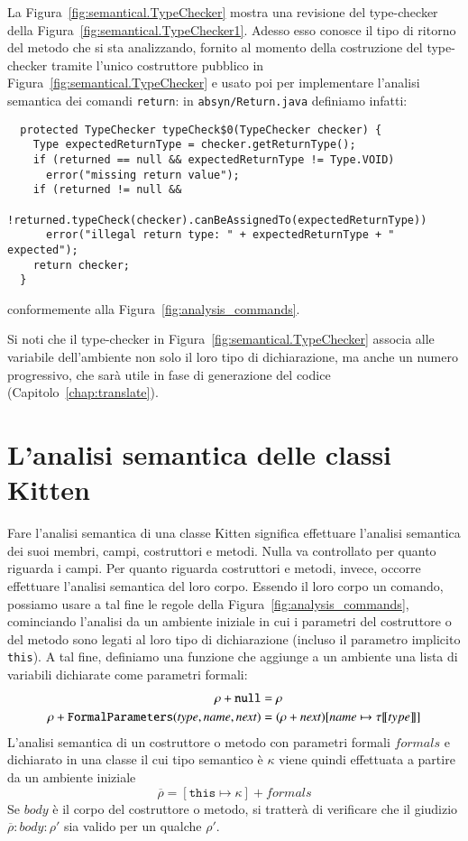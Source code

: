 La Figura~\ref{fig:semantical.TypeChecker} mostra una revisione del
type-checker della Figura~\ref{fig:semantical.TypeChecker1}.
Adesso esso conosce il tipo di ritorno del metodo che
si sta analizzando, fornito al momento della
costruzione del type-checker tramite l'unico costruttore pubblico
in Figura~\ref{fig:semantical.TypeChecker} e usato poi per
implementare l'analisi semantica dei comandi \texttt{return}: in
\texttt{absyn/Return.java} definiamo infatti:
%
\begin{verbatim}
  protected TypeChecker typeCheck$0(TypeChecker checker) {
    Type expectedReturnType = checker.getReturnType();
    if (returned == null && expectedReturnType != Type.VOID)
      error("missing return value");
    if (returned != null &&
        !returned.typeCheck(checker).canBeAssignedTo(expectedReturnType))
      error("illegal return type: " + expectedReturnType + " expected");
    return checker;
  }
\end{verbatim}
conformemente alla Figura~\ref{fig:analysis_commands}.

Si noti che il type-checker in Figura~\ref{fig:semantical.TypeChecker} associa
alle variabile dell'ambiente non solo il loro tipo di dichiarazione,
ma anche un numero progressivo, che sar\`a utile in fase di generazione del
codice (Capitolo~\ref{chap:translate}).
%
\section{L'analisi semantica delle classi Kitten}
  \label{sec:analysis_classes}
%
Fare l'analisi semantica di una classe Kitten significa effettuare
l'analisi semantica dei suoi membri, \cioe campi, costruttori e metodi.
Nulla va controllato per quanto riguarda i campi. Per quanto riguarda
costruttori e metodi, invece, occorre effettuare l'analisi semantica
del loro corpo. Essendo il loro corpo un comando, possiamo usare a tal
fine le regole della Figura~\ref{fig:analysis_commands}, cominciando
l'analisi da un ambiente iniziale in cui i parametri del costruttore o del
metodo sono legati al loro tipo di dichiarazione (incluso il parametro
implicito \texttt{this}). A tal fine, definiamo una funzione che
aggiunge a un ambiente una lista di variabili dichiarate come parametri
formali:
%
\begin{align*}
  \rho+{\mathtt{null}}&=\rho \\
  \rho+{\mathtt{FormalParameters(\mathit{type},\mathit{name},\mathit{next})}}&=(\rho+{\mathit{next}})[\mathit{name}\mapsto{\tau[\![{type}]\!]}]
\end{align*}
%
L'analisi semantica di un costruttore o metodo con parametri formali
$\mathit{formals}$ e dichiarato in una classe
il cui tipo semantico \`e $\kappa$ viene quindi effettuata
a partire da un ambiente iniziale
\[
  \overline{\rho}=[\mathtt{this}\mapsto\kappa]+{\mathit{formals}}
\]
Se $\mathit{body}$ \`e il corpo del costruttore o metodo, si tratter\`a
di verificare che il giudizio $\overline{\rho}:\mathit{body}:\rho'$ sia
valido per un qualche $\rho'$.

